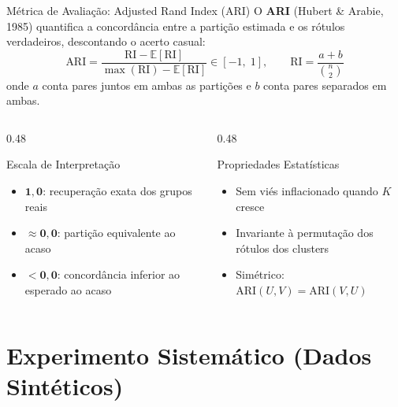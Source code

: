 \documentclass[aspectratio=169,11pt]{beamer}
\begin{document}
\begin{frame}{Métrica de Avaliação: Adjusted Rand Index (ARI)}
  O \textbf{ARI} (Hubert \& Arabie, 1985) quantifica a concordância entre a
  partição estimada e os rótulos verdadeiros, descontando o acerto casual:
  \[
    \text{ARI} = \frac{\text{RI} - \mathbb{E}[\text{RI}]}
                      {\max(\text{RI}) - \mathbb{E}[\text{RI}]} \in [-1,\; 1],
    \qquad
    \text{RI} = \frac{a + b}{\binom{n}{2}}
  \]
  onde $a$ conta pares juntos em ambas as partições e $b$ conta pares separados
  em ambas.

  \vspace{0.5em}
  \begin{columns}[T]
    \begin{column}{0.48\textwidth}
      \begin{block}{Escala de Interpretação}
        \small
        \begin{itemize}
          \item $\mathbf{1{,}0}$: recuperação exata dos grupos reais
          \item $\mathbf{\approx 0{,}0}$: partição equivalente ao acaso
          \item $\mathbf{< 0{,}0}$: concordância inferior ao esperado ao acaso
        \end{itemize}
      \end{block}
    \end{column}
    \begin{column}{0.48\textwidth}
      \begin{block}{Propriedades Estatísticas}
        \small
        \begin{itemize}
          \item Sem viés inflacionado quando $K$ cresce
          \item Invariante à permutação dos rótulos dos clusters
          \item Simétrico: $\text{ARI}(U, V) = \text{ARI}(V, U)$
        \end{itemize}
      \end{block}
    \end{column}
  \end{columns}
\end{frame}

\section{Experimento Sistemático (Dados Sintéticos)}
\end{document}
